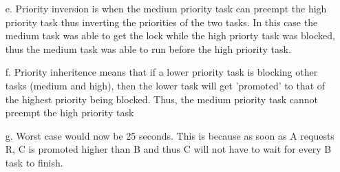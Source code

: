 \documentclass[11pt]{article}
\theoremstyle{definition}
\begin{document}
\begin{enumerate}
	\item[e.] Priority inversion is when the medium priority task can preempt the high priority task thus inverting the priorities of the two tasks.  In this case the medium task was able to get the lock while the high priorty 
	task was blocked, thus the medium task was able to run before the high priority task.
	
	\item[f.] Priority inheritence means that if a lower priority task is blocking other tasks (medium and high), then the lower task will get 'promoted' to that of the highest priority being blocked.  Thus, the medium priority task cannot
	preempt the high priority task
	
	\item[g.] Worst case would now be 25 seconds.  This is because as soon as A requests R, C is promoted higher than B and thus C will not have to wait for every B task to finish.  
\end{enumerate}
\end{document}
